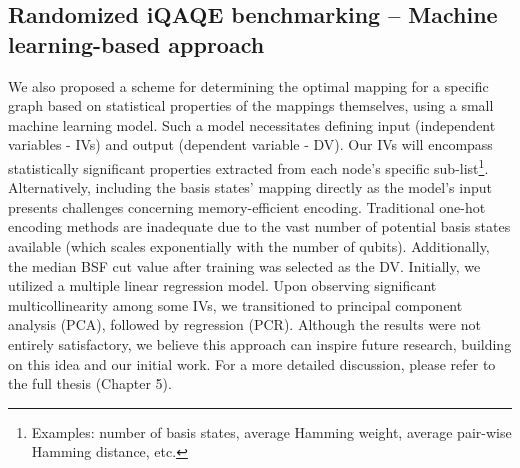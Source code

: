 \subsection{Randomized iQAQE benchmarking -- Machine learning-based approach}
\label{subsection:Randomized_iQAQE_ML}
We also proposed a scheme for determining the optimal mapping for a specific graph based on statistical properties of the mappings themselves, using a small machine learning model. Such a model necessitates defining input (independent variables - IVs) and output (dependent variable - DV). Our IVs will encompass statistically significant properties extracted from each node's specific sub-list\footnote{Examples: number of basis states, average Hamming weight, average pair-wise Hamming distance, etc.}. Alternatively, including the basis states' mapping directly as the model's input presents challenges concerning memory-efficient encoding. Traditional one-hot encoding methods are inadequate due to the vast number of potential basis states available (which scales exponentially with the number of qubits). Additionally, the median BSF cut value after training was selected as the DV. Initially, we utilized a multiple linear regression model. Upon observing significant multicollinearity among some IVs, we transitioned to principal component analysis (PCA), followed by regression (PCR). Although the results were not entirely satisfactory, we believe this approach can inspire future research, building on this idea and our initial work. For a more detailed discussion, please refer to the full thesis (Chapter 5).